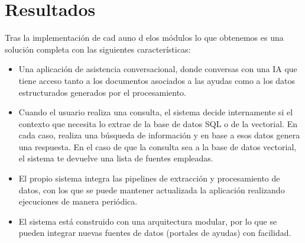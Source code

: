 \section{Resultados}

Tras la implementación de cad auno d elos módulos lo que obtenemos es una solución completa con las siguientes características:

\begin{itemize}
    \item Una aplicación de asistencia conversacional, donde conversas con una IA que tiene acceso tanto a los documentos asociados a las ayudas como a los datos estructurados generados por el procesamiento.
    \item Cuando el usuario realiza una consulta, el sistema decide internamente si el contexto que necesita lo extrae de la base de datos SQL o de la vectorial. En cada caso, realiza una búsqueda de información y en base a esos datos genera una respuesta.
    En el caso de que la consulta sea a la base de datos vectorial, el sistema te devuelve una lista de fuentes empleadas.
    \item El propio sistema integra las pipelines de extracción y procesamiento de datos, con los que se puede mantener actualizada la aplicación realizando ejecuciones de manera periódica.
    \item El sistema está construido con una arquitectura modular, por lo que se pueden integrar nuevas fuentes de datos (portales de ayudas) con facilidad.
\end{itemize}